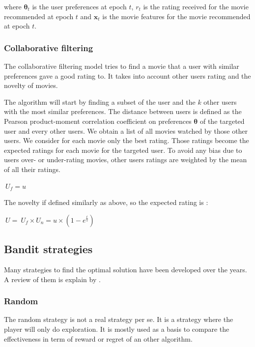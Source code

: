 \documentclass[letterpaper]{article}
\begin{document}
where $\boldsymbol{\theta}_{t} $ is the user preferences at epoch $t$, $ r_{t} $ is the rating received for the movie recommended at epoch $t$ and $\boldsymbol{x}_{t}$ is the movie features for the movie recommended at epoch $t$.

\subsubsection{Collaborative filtering}

The collaborative filtering model tries to find a movie that a user with similar preferences gave a good rating to. It takes into account other users rating and the novelty of movies.

The algorithm will start by finding a subset of the user and the $k$ other users with the most similar preferences. The distance between users is defined as the Pearson product-moment correlation coefficient on preferences $\boldsymbol{\theta}$ of the targeted user and every other users. We obtain a list of all movies watched by those other users. We consider for each movie only the best rating. Those ratings become the expected ratings for each movie for the targeted user. To avoid any bias due to users over- or under-rating movies, other users ratings are weighted by the mean of all their ratings.

\begin{center}
	$ \ U_{f} = u $ 
\end{center}

The novelty if defined similarly as above, so the expected rating is :

\begin{center}
	$ \ U = \ U_{f} \times  U_{n} = u \times (1 - e^{\frac{t}{s}}) $ 
\end{center}



\subsection{Bandit strategies}

Many strategies to find the optimal solution have been developed over the years. A review of them is explain by \cite{kuleshov2014algorithms}.

\subsubsection{Random}

The random strategy is not a real strategy per se. It is a strategy where the player will only do exploration. It is mostly used as a basis to compare the effectiveness in term of reward or regret of an other algorithm.
\end{document}
